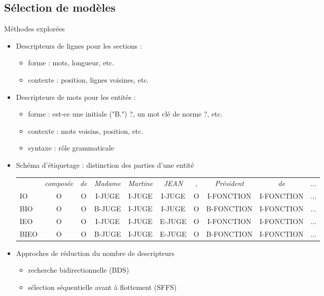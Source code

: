 \subsection{Sélection de modèles}
\begin{frame}[t]{\mysubsectiontitle}		
	Méthodes explorées
	
	\begin{itemize} \small
		\item Descripteurs de lignes pour les sections : 
		 \begin{itemize}
			\item forme : mots, longueur, etc. 
			\item contexte : position, lignes voisines, etc.
		 \end{itemize}
		\item Descripteurs de mots pour les entités : 
		\begin{itemize}
			\item forme : est-ce une initiale ("B.") ?,  un mot clé de norme ?, etc.
			\item contexte : mots voisins, position, etc.
			\item syntaxe : rôle grammaticale
		\end{itemize}
		\item Schéma d'étiquetage : distinction des parties d'une entité {\tiny
		\begin{tabular}{l|ccccccccc}
			& \textit{composée} & \textit{de} & \textit{Madame} & \textit{Martine} & \textit{JEAN} & , & \textit{Président} & \textit{de} & ... \\ 
			IO & O & O & I-JUGE & I-JUGE & I-JUGE & O & I-FONCTION & I-FONCTION & ... \\
			BIO & O & O & B-JUGE & I-JUGE & I-JUGE & O & B-FONCTION & I-FONCTION & ... \\
			IEO & O & O & I-JUGE & I-JUGE & E-JUGE & O & I-FONCTION & I-FONCTION & ...\\
			BIEO & O & O & B-JUGE & I-JUGE & E-JUGE & O & B-FONCTION & I-FONCTION & ... \\
		\end{tabular}}
		\item Approches de réduction du nombre de descripteurs
		\begin{itemize}
			\item recherche bidirectionnelle (BDS) \cite{liu2012featureSelection}
			\item sélection séquentielle avant à flottement (SFFS) \cite{pudil1994floatingFeatSelection}
		\end{itemize}
	\end{itemize}	
\end{frame}

